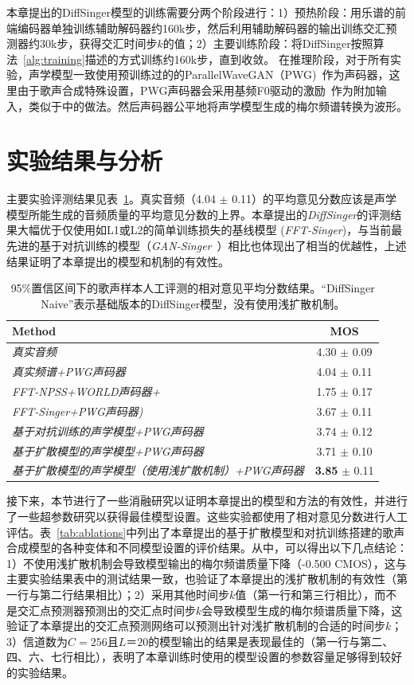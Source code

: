 本章提出的DiffSinger模型的训练需要分两个阶段进行：1）预热阶段：用乐谱的前端编码器单独训练辅助解码器约160k步，然后利用辅助解码器的输出训练交汇预测器约30k步，获得交汇时间步$k$的值；2）主要训练阶段：将DiffSinger按照算法~\ref{alg:training}描述的方式训练约160k步，直到收敛。
在推理阶段，对于所有实验，声学模型一致使用预训练过的的ParallelWaveGAN（PWG)~\citep{yamamoto2020parallel}作为声码器，这里由于歌声合成特殊设置，PWG声码器会采用基频F0驱动的激励~\citep{wang2020using}作为附加输入，类似于\citet{chen2020hifisinger}中的做法。然后声码器公平地将声学模型生成的梅尔频谱转换为波形。
\section{实验结果与分析}
主要实验评测结果见表~\ref{tab:main_exp}。真实音频（4.04 $\pm$ 0.11）的平均意见分数应该是声学模型所能生成的音频质量的平均意见分数的上界。本章提出的\textit{DiffSinger}的评测结果大幅优于仅使用如L1或L2的简单训练损失的基线模型 (\textit{FFT-Singer})，与当前最先进的基于对抗训练的模型（\textit{GAN-Singer}~\cite{wu2020adversarially}）相比也体现出了相当的优越性，上述结果证明了本章提出的模型和机制的有效性。
\begin{table}[ht]
	\centering
	\caption{95\%置信区间下的歌声样本人工评测的相对意见平均分数结果。``DiffSinger Naive''表示基础版本的DiffSinger模型，没有使用浅扩散机制。}
	\begin{tabular}{l|c}
		\toprule
		Method &  MOS  \\
		\midrule
		\textit{真实音频} & 4.30 $\pm$ 0.09  \\
	    \textit{真实频谱+PWG声码器} & 4.04 $\pm$ 0.11  \\
		\midrule
		\textit{FFT-NPSS+WORLD声码器+} & 1.75  $\pm$ 0.17  \\
		\textit{FFT-Singer+PWG声码器)} & 3.67 $\pm$ 0.11 \\
		\textit{基于对抗训练的声学模型+PWG声码器} & 3.74 $\pm$ 0.12  \\
		\midrule
		\textit{基于扩散模型的声学模型+PWG声码器} & 3.71 $\pm$ 0.10 \\
		\textit{基于扩散模型的声学模型（使用浅扩散机制）+PWG声码器} & \textbf{3.85} $\pm$ 0.11 \\
		\bottomrule
	\end{tabular}
	\label{tab:main_exp}
\end{table}
接下来，本节进行了一些消融研究以证明本章提出的模型和方法的有效性，并进行了一些超参数研究以获得最佳模型设置。这些实验都使用了相对意见分数进行人工评估。表~\ref{tab:ablations}中列出了本章提出的基于扩散模型和对抗训练搭建的歌声合成模型的各种变体和不同模型设置的评价结果。从中，可以得出以下几点结论：1）不使用浅扩散机制会导致模型输出的梅尔频谱质量下降（-0.500 CMOS），这与主要实验结果表中的测试结果一致，也验证了本章提出的浅扩散机制的有效性（第一行与第二行结果相比）；2）采用其他时间步$k$值（第一行和第三行相比），而不是交汇点预测器预测出的交汇点时间步$k$会导致模型生成的梅尔频谱质量下降，这验证了本章提出的交汇点预测网络可以预测出针对浅扩散机制的合适的时间步$k$；3）信道数为$C=256$且$L＝20$的模型输出的结果是表现最佳的（第一行与第二、四、六、七行相比），表明了本章训练时使用的模型设置的参数容量足够得到较好的实验结果。

